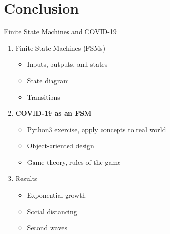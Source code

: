 \documentclass{beamer}
\begin{document}
\section{Conclusion}

\begin{frame}{Finite State Machines and COVID-19}
\begin{enumerate}
\item Finite State Machines (FSMs)
\begin{itemize}
\item Inputs, outputs, and states
\item State diagram
\item Transitions
\end{itemize}
\item \textbf{COVID-19 as an FSM}
\begin{itemize}
\item Python3 exercise, apply concepts to real world
\item Object-oriented design
\item Game theory, rules of the game
\end{itemize}
\item Results
\begin{itemize}
\item Exponential growth
\item Social distancing
\item \alert{Second waves}
\end{itemize}
\end{enumerate}
\end{frame}
\end{document}
